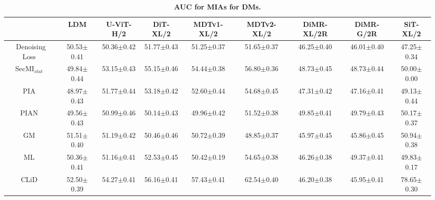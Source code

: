 \begin{table}[h!]
    \centering
    \tiny
    \setlength{\tabcolsep}{3pt}
    \caption{\textbf{AUC for MIAs for DMs.}}
    \begin{tabular}{ccccccccc}
    \toprule
     & LDM & U-ViT-H/2 & DiT-XL/2 & MDTv1-XL/2 & MDTv2-XL/2 & DiMR-XL/2R & DiMR-G/2R & SiT-XL/2 \\
    \midrule
    Denoising Loss~\citep{carlini2023extracting} & 50.53{\tiny $\pm$0.41} & 50.36{\tiny $\pm$0.42} & 51.77{\tiny $\pm$0.43} & 51.25{\tiny $\pm$0.37} & 51.65{\tiny $\pm$0.37} & 46.25{\tiny $\pm$0.40} & 46.01{\tiny $\pm$0.40} & 47.25{\tiny $\pm$0.34} \\
    SecMI$_{stat}$~\citep{dm2_duan23bSecMI} & 49.84{\tiny $\pm$0.44} & 53.15{\tiny $\pm$0.43} & 55.15{\tiny $\pm$0.46} & 54.44{\tiny $\pm$0.38} & 56.80{\tiny $\pm$0.36} & 48.73{\tiny $\pm$0.45} & 48.73{\tiny $\pm$0.44} & 50.00{\tiny $\pm$0.00} \\
    PIA~\citep{kong2023efficient} & 48.97{\tiny $\pm$0.43} & 51.77{\tiny $\pm$0.44} & 53.18{\tiny $\pm$0.42} & 52.60{\tiny $\pm$0.44} & 54.68{\tiny $\pm$0.45} & 47.31{\tiny $\pm$0.42} & 47.16{\tiny $\pm$0.41} & 49.13{\tiny $\pm$0.44} \\
    PIAN~\citep{kong2023efficient} & 49.56{\tiny $\pm$0.43} & 50.99{\tiny $\pm$0.46} & 50.14{\tiny $\pm$0.43} & 49.96{\tiny $\pm$0.42} & 51.52{\tiny $\pm$0.38} & 49.85{\tiny $\pm$0.41} & 49.79{\tiny $\pm$0.43} & 50.17{\tiny $\pm$0.37} \\
    GM~\citep{dubinski2024cdicopyrighteddataidentification} & 51.51{\tiny $\pm$0.40} & 51.19{\tiny $\pm$0.42} & 50.46{\tiny $\pm$0.46} & 50.72{\tiny $\pm$0.39} & 48.85{\tiny $\pm$0.37} & 45.97{\tiny $\pm$0.45} & 45.86{\tiny $\pm$0.45} & 50.94{\tiny $\pm$0.38} \\
    ML~\citep{dubinski2024cdicopyrighteddataidentification} & 50.36{\tiny $\pm$0.41} & 51.16{\tiny $\pm$0.41} & 52.53{\tiny $\pm$0.45} & 50.42{\tiny $\pm$0.19} & 54.65{\tiny $\pm$0.38} & 46.26{\tiny $\pm$0.38} & 49.37{\tiny $\pm$0.41} & 49.83{\tiny $\pm$0.17} \\
    CLiD~\citep{zhai2024clid} & 52.50{\tiny $\pm$0.39} & 54.27{\tiny $\pm$0.41} & 56.16{\tiny $\pm$0.41} & 57.43{\tiny $\pm$0.41} & 62.54{\tiny $\pm$0.40} & 46.20{\tiny $\pm$0.38} & 45.95{\tiny $\pm$0.41} & 78.65{\tiny $\pm$0.30} \\
    \bottomrule
    \end{tabular}
    \label{tab:auc_dm}
\end{table}



